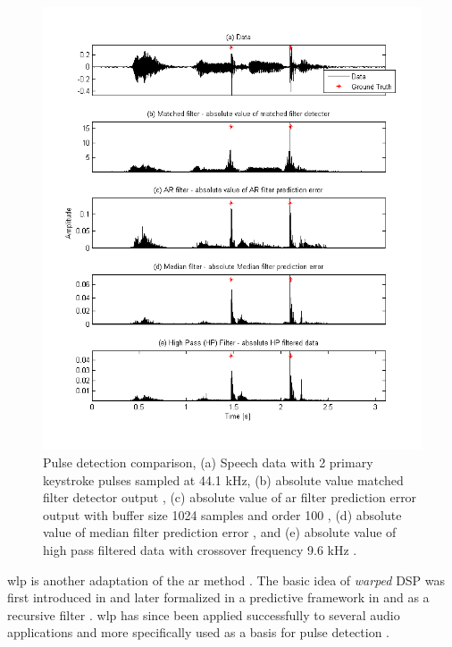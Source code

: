 \begin{figure}[!] %
\centering
\includegraphics[width=130mm]{LitRev_DetectCompare2New.png}
\caption{Pulse detection comparison, (a) Speech data with 2 primary keystroke pulses sampled at 44.1 kHz, (b) absolute value matched filter detector output \cite{Vaseghi1988}, (c) absolute value of \gls{ar} filter prediction error output with buffer size 1024 samples and order 100 \cite{Vaseghi1990}, (d) absolute value of median filter prediction error \cite{Tukey1974}, and (e) absolute value of high pass filtered data with crossover frequency 9.6 kHz \cite{Godsill1998book}\cite{Kasparis1993}\cite{US6795559}.}
\label{fig:LitRev_DetectCompare2}
\end{figure}

\gls{wlp} is another adaptation of the \gls{ar} method \cite{Esquef2002}. The basic idea of \emph{warped} DSP was first introduced in \cite{Oppenheim1983} and later formalized in a predictive framework in \cite{Strube1980} and as a recursive filter \cite{Steiglitz1980}. \gls{wlp} has since been applied successfully to several audio applications \cite{Karjalainen1997}\cite{Haermae2000} and more specifically used as a basis for pulse detection \cite{Esquef2000}\cite{Esquef2002}.

